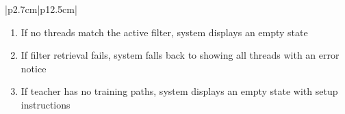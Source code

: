\begin{table}[H]
\begin{tabular}{|p{2.7cm}|p{12.5cm}|}
\begin{minipage}[t]{\linewidth}
            \begin{enumerate}[topsep=0pt,itemsep=1pt,parsep=0pt,partopsep=0pt]
                \item If no threads match the active filter, system displays an empty state
                \item If filter retrieval fails, system falls back to showing all threads with an error notice
                \item If teacher has no training paths, system displays an empty state with setup instructions
            \end{enumerate}
        \end{minipage} \\
        \hline
    \end{tabular}
    \label{tab:teacher-forum-inbox}
\end{table}
